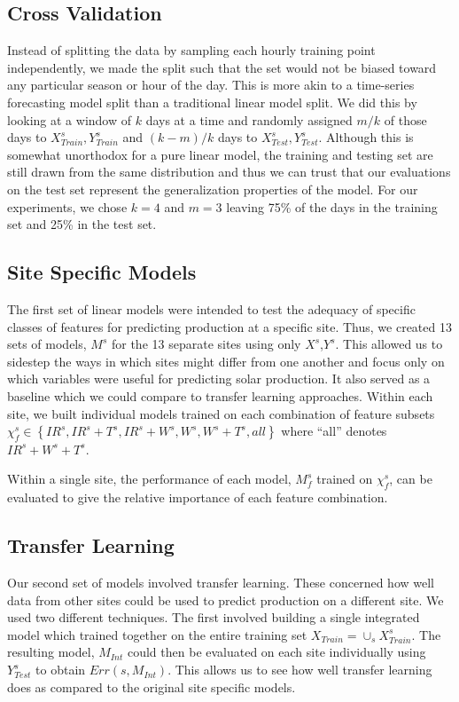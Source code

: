 \documentclass[11pt, fullpage,letterpaper]{article}
\begin{document}
\subsection{Cross Validation}

Instead of splitting the data by sampling each hourly training point independently, we made the split such that the set would not be biased toward any particular season or hour of the day. This is more akin to a time-series forecasting model split than a traditional linear model split. We did this by looking at a window of $k$ days at a time and randomly assigned $m / k$ of those days to $X^s_{Train},Y^s_{Train}$ and $(k - m) / k$ days to $X^s_{Test},Y^s_{Test}$. Although this is somewhat unorthodox for a pure linear model, the training and testing set are still drawn from the same distribution and thus we can trust that our evaluations on the test set represent the generalization properties of the model. For our experiments, we chose $k=4$ and $m=3$ leaving 75\% of the days in the training set and 25\% in the test set.

\subsection{Site Specific Models}

The first set of linear models were intended to test the adequacy of specific classes of features for predicting production at a specific site. Thus, we created 13 sets of models, $M^s$ for the 13 separate sites using only $X^s$,$Y^s$. This allowed us to sidestep the ways in which sites might differ from one another and focus only on which variables were useful for predicting solar production. It also served as a baseline which we could compare to transfer learning approaches.
Within each site, we built individual models trained on each combination of feature subsets $\chi_f^s \in \left\{ IR^s,IR^s + T^s, IR^s + W^s, W^s,W^s + T^s, all \right\}$ where ``all'' denotes $IR^s+W^s+T^s$. 

Within a single site, the performance of each model, $M_f^s$ trained on $\chi_f^s$, can be evaluated to give the relative importance of each feature combination.

\subsection{Transfer Learning}

Our second set of models involved transfer learning. These concerned how well data from other sites could be used to predict production on a different site. We used two different techniques. The first involved building a single integrated model which trained together on the entire training set $X_{Train}=\cup_s X^s_{Train}$. The resulting model, $M_{Int}$ could then be evaluated on each site individually using $Y^s_{Test}$ to obtain $Err(s,M_{Int})$. This allows us to see how well transfer learning does as compared to the original site specific models. 
\end{document}
